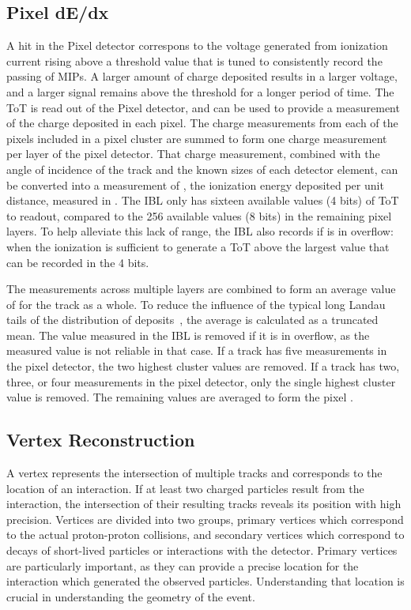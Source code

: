 \subsection{Pixel dE/dx}
\label{sec:pixel_dedx}

A hit in the Pixel detector correspons to the voltage generated from ionization current rising above a threshold value that is tuned to consistently record the passing of \acp{MIP}. 
A larger amount of charge deposited results in a larger voltage, and a larger signal remains above the threshold for a longer period of time.
The \ac{ToT} is read out of the Pixel detector, and can be used to provide a measurement of the charge deposited in each pixel.
The charge measurements from each of the pixels included in a pixel cluster are summed to form one charge measurement per layer of the pixel detector.
That charge measurement, combined with the angle of incidence of the track and the known sizes of each detector element, can be converted into a measurement of \dedx, the ionization energy deposited per unit distance, measured in \MeVgcm. 
The \ac{IBL} only has sixteen available values (4 bits) of \ac{ToT} to readout, compared to the 256 available values (8 bits) in the remaining pixel layers.
To help alleviate this lack of range, the \ac{IBL} also records if is in overflow: when the ionization is sufficient to generate a \ac{ToT} above the largest value that can be recorded in the 4 bits.

The measurements across multiple layers are combined to form an average value of \dedx for the track as a whole.
To reduce the influence of the typical long Landau tails of the distribution of \dedx deposits~\cite{pdg}, the average is calculated as a truncated mean.
The value measured in the \ac{IBL} is removed if it is in overflow, as the measured value is not reliable in that case.
If a track has five measurements in the pixel detector, the two highest cluster values are removed.
If a track has two, three, or four measurements in the pixel detector, only the single highest cluster value is removed.
The remaining values are averaged to form the pixel \dedx.

\subsection{Vertex Reconstruction}

A vertex represents the intersection of multiple tracks and corresponds to the location of an interaction.
If at least two charged particles result from the interaction, the intersection of their resulting tracks reveals its position with high precision.
Vertices are divided into two groups, primary vertices which correspond to the actual proton-proton collisions, and secondary vertices which correspond to decays of short-lived particles or interactions with the detector. 
Primary vertices are particularly important, as they can provide a precise location for the interaction which generated the observed particles.
Understanding that location is crucial in understanding the geometry of the event.

